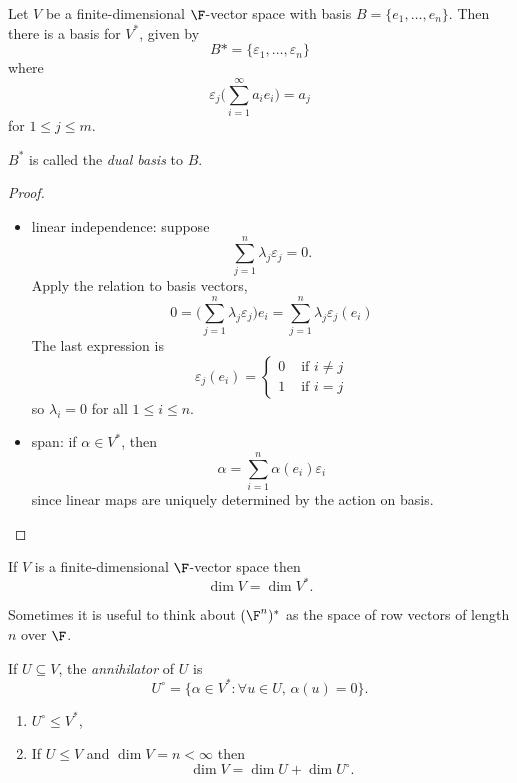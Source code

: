 \documentclass[a4paper]{article}
\newcommand*{\ann}{\circ}
\theoremstyle{definition}
\begin{document}
\begin{lem}
  Let \(V\) be a finite-dimensional \(\F\)-vector space with basis \(B = \{e_1,\dots,e_n\}\). Then there is a basis for \(V^*\), given by
  \[
    B* = \{\varepsilon_1,\dots, \varepsilon_n\}
  \]
  where
  \[
    \varepsilon_j \Big( \sum_{i=1}^{\infty} a_i e_i \Big) = a_j
  \]
  for \(1\leq j\leq m\).

  \(B^*\) is called the \emph{dual basis} to \(B\).
\end{lem}

\begin{proof}\leavevmode
  \begin{itemize}
  \item linear independence: suppose
    \[
      \sum_{j=1}^{n}\lambda_j\varepsilon_j = 0.
    \]
    Apply the relation to basis vectors,
    \[
      0 = \Big( \sum_{j=1}^n \lambda_j\varepsilon_j \Big) e_i = \sum_{j=1}^n \lambda_j\varepsilon_j(e_i)
      \]
      The last expression is 
      \[
        \varepsilon_j(e_i) = 
      \begin{cases}
        0 & \text{ if } i \neq j \\
        1 & \text{ if } i = j
      \end{cases}
    \]
    so \(\lambda_i=0\) for all \(1 \leq i \leq n\).
  \item span: if \(\alpha \in V^*\), then
    \[
      \alpha = \sum_{i=1}^{n}\alpha(e_i)\varepsilon_i
    \]
    since linear maps are uniquely determined by the action on basis.
  \end{itemize}
\end{proof}

\begin{cor}
  If \(V\) is a finite-dimensional \(\F\)-vector space then
  \[
    \dim V = \dim V^*.
  \]
\end{cor}

\begin{rmk}
  Sometimes it is useful to think about \((\F^n)^*\) as the space of row vectors of length \(n\) over \(\F\).
\end{rmk}

\begin{defi}[Annihilator]
  If \(U \subseteq V\), the \emph{annihilator} of \(U\) is
  \[
    U^\ann = \{\alpha\in V^*: \forall u \in U,\,\alpha(u) = 0 \}.
  \]
\end{defi}

\begin{lem}\leavevmode
  \begin{enumerate}
  \item \(U^\ann \leq V^*\),
  \item If \(U \leq V\) and \(\dim V = n < \infty\) then
    \[
      \dim V = \dim U + \dim U^\ann.
    \]
  \end{enumerate}
\end{lem}
\end{document}
